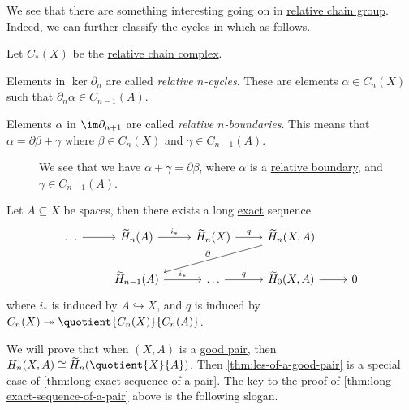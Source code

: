 We see that there are something interesting going on in \hyperref[def:relative-chain-group]{relative chain group}. Indeed, we can further classify the
\hyperref[def:cycle]{cycles} in which as follows.
\begin{definition*}
	Let \(C_\ast(X)\) be the \hyperref[def:relative-chain-complex]{relative chain complex}.
	\begin{definition}\label{def:relative-cycle}
		Elements in \(\ker \partial_n\) are called \emph{relative \(n\)-cycles}. These are elements \(\alpha \in C_n(X)\)
		such that \(\partial_n\alpha \in C_{n - 1}(A)\).
		\begin{figure}[H]
			\centering
			\label{fig:def:relative-homology-1}
		\end{figure}
	\end{definition}
	\begin{definition}\label{def:relative-boundary}
		Elements \(\alpha\) in \(\im \partial_{n + 1}\) are called \emph{relative \(n\)-boundaries}. This means that
		\(\alpha = \partial \beta + \gamma\) where \(\beta \in C_n(X)\) and \(\gamma \in C_{n - 1}(A)\).
		\begin{figure}[H]
			\centering
			\caption{We see that we have \(\alpha +\gamma =\partial \beta \), where \(\alpha \) is a \hyperref[def:relative-boundary]{relative boundary},
				and \(\gamma \in C_{n-1}(A)\).}
			\label{fig:def:relative-homology-2}
		\end{figure}
	\end{definition}
\end{definition*}

\begin{theorem}\label{thm:long-exact-sequence-of-a-pair}
	Let \(A \subseteq X\) be spaces, then there exists a long \hyperref[def:exact]{exact} sequence
	\[
		\begin{tikzcd}
			{\ldots} & {\widetilde{H}_n(A)} & {\widetilde{H}_n(X)} & {\widetilde{H}_n(X, A)} \\
			& {\widetilde{H}_{n-1}(A)} & \ldots & {\widetilde{H}_{0}(X, A)} & 0
			\arrow[from=1-1, to=1-2]
			\arrow["{i_\ast}", from=1-2, to=1-3]
			\arrow["q", from=1-3, to=1-4]
			\arrow[from=2-4, to=2-5]
			\arrow["{q}", from=2-3, to=2-4]
			\arrow["{i_\ast}", from=2-2, to=2-3]
			\arrow["{\partial}"', from=1-4, to=2-2]
		\end{tikzcd}
	\]
	where \(i_\ast\) is induced by \(A\hookrightarrow X\), and \(q\) is induced by \(C_{n} (X)\twoheadrightarrow \quotient{C_{n} (X)}{C_{n} (A)}\).
\end{theorem}
We will prove that when \((X, A)\) is a \hyperref[def:good-pair]{good pair}, then \(H_n(X, A) \cong \widetilde{H}_n(\quotient{X}{A})\). Then \autoref{thm:les-of-a-good-pair}
is a special case of \autoref{thm:long-exact-sequence-of-a-pair}. The key to the proof of \autoref{thm:long-exact-sequence-of-a-pair} above is the following slogan.

